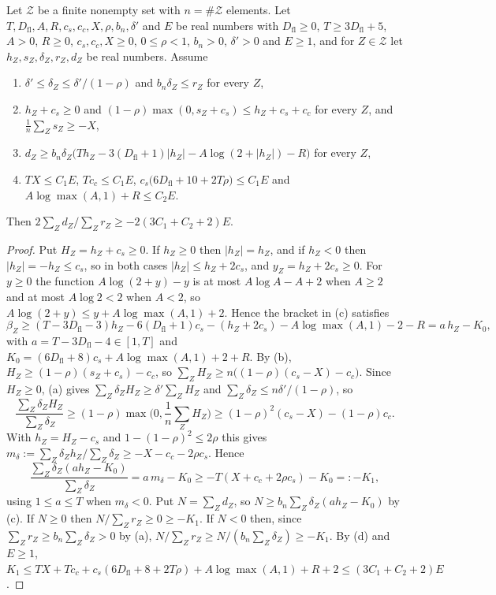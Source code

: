 \begin{lemma}\label{cov:mean}
Let $\mathcal Z$ be a finite nonempty set with $n=\#\mathcal Z$ elements. Let $T,D_{\mathrm{fl}},A,R,c_s,c_c,X,\rho,b_n,\delta'$ and $E$ be real numbers with $D_{\mathrm{fl}}\ge0$, $T\ge3D_{\mathrm{fl}}+5$, $A>0$, $R\ge0$, $c_s,c_c,X\ge0$, $0\le\rho<1$, $b_n>0$, $\delta'>0$ and $E\ge1$, and for $Z\in\mathcal Z$ let $h_Z,s_Z,\delta_Z,r_Z,d_Z$ be real numbers. Assume
\begin{enumerate}
\item[(a)] $\delta'\le\delta_Z\le\delta'/(1-\rho)$ and $b_n\delta_Z\le r_Z$ for every $Z$,
\item[(b)] $h_Z+c_s\ge0$ and $(1-\rho)\max(0,s_Z+c_s)\le h_Z+c_s+c_c$ for every $Z$, and $\frac1n\sum_Zs_Z\ge-X$,
\item[(c)] $d_Z\ge b_n\delta_Z\big(Th_Z-3(D_{\mathrm{fl}}+1)\lvert h_Z\rvert-A\log(2+\lvert h_Z\rvert)-R\big)$ for every $Z$,
\item[(d)] $TX\le C_1E$, $Tc_c\le C_1E$, $c_s\big(6D_{\mathrm{fl}}+10+2T\rho\big)\le C_1E$ and $A\log\max(A,1)+R\le C_2E$.
\end{enumerate}
Then $2\sum_Zd_Z/\sum_Zr_Z\ge-2(3C_1+C_2+2)E$.
\end{lemma}

\begin{proof}
Put $H_Z=h_Z+c_s\ge0$. If $h_Z\ge0$ then $\lvert h_Z\rvert=h_Z$, and if $h_Z<0$ then $\lvert h_Z\rvert=-h_Z\le c_s$, so in both cases $\lvert h_Z\rvert\le h_Z+2c_s$, and $y_Z=h_Z+2c_s\ge0$. For $y\ge0$ the function $A\log(2+y)-y$ is at most $A\log A-A+2$ when $A\ge2$ and at most $A\log2<2$ when $A<2$, so $A\log(2+y)\le y+A\log\max(A,1)+2$. Hence the bracket in (c) satisfies
\[
\beta_Z\ge(T-3D_{\mathrm{fl}}-3)h_Z-6(D_{\mathrm{fl}}+1)c_s-(h_Z+2c_s)-A\log\max(A,1)-2-R=a\,h_Z-K_0,
\]
with $a=T-3D_{\mathrm{fl}}-4\in[1,T]$ and $K_0=(6D_{\mathrm{fl}}+8)c_s+A\log\max(A,1)+2+R$. By (b), $H_Z\ge(1-\rho)(s_Z+c_s)-c_c$, so $\sum_ZH_Z\ge n\big((1-\rho)(c_s-X)-c_c\big)$. Since $H_Z\ge0$, (a) gives $\sum_Z\delta_ZH_Z\ge\delta'\sum_ZH_Z$ and $\sum_Z\delta_Z\le n\delta'/(1-\rho)$, so
\[
\frac{\sum_Z\delta_ZH_Z}{\sum_Z\delta_Z}\ge(1-\rho)\max\Big(0,\frac1n\sum_ZH_Z\Big)\ge(1-\rho)^2(c_s-X)-(1-\rho)c_c .
\]
With $h_Z=H_Z-c_s$ and $1-(1-\rho)^2\le2\rho$ this gives $m_\delta:=\sum_Z\delta_Zh_Z/\sum_Z\delta_Z\ge-X-c_c-2\rho c_s$. Hence
\[
\frac{\sum_Z\delta_Z(ah_Z-K_0)}{\sum_Z\delta_Z}=a\,m_\delta-K_0\ge-T(X+c_c+2\rho c_s)-K_0=:-K_1 ,
\]
using $1\le a\le T$ when $m_\delta<0$. Put $N=\sum_Zd_Z$, so $N\ge b_n\sum_Z\delta_Z(ah_Z-K_0)$ by (c). If $N\ge0$ then $N/\sum_Zr_Z\ge0\ge-K_1$. If $N<0$ then, since $\sum_Zr_Z\ge b_n\sum_Z\delta_Z>0$ by (a), $N/\sum_Zr_Z\ge N/(b_n\sum_Z\delta_Z)\ge-K_1$. By (d) and $E\ge1$, $K_1\le TX+Tc_c+c_s(6D_{\mathrm{fl}}+8+2T\rho)+A\log\max(A,1)+R+2\le(3C_1+C_2+2)E$.
\end{proof}

